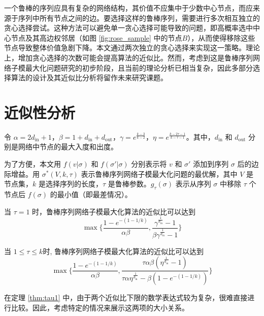 一个鲁棒的序列应具有复杂的网络结构，其价值不应集中于少数中心节点，而应来源于序列中所有节点之间的边。要选择这样的鲁棒序列，需要进行多次相互独立的贪心选择尝试。这种方法可以避免单一贪心选择可能导致的问题，即高概率选中中心节点及其高边权邻居（如图 \ref{fig:rose_sample} 中的节点$B$），从而使得移除这些节点导致整体价值急剧下降。本文通过两次独立的贪心选择来实现这一策略。理论上，增加贪心选择的次数可能会提高算法的近似比。然而，考虑到这是鲁棒序列网络子模最大化问题研究的初步阶段，且当前的理论分析已相当复杂，因此多部分选择算法的设计及其近似比分析将留作未来研究课题。

\section{近似性分析}
\label{sec:3_3}

令 $\alpha=2 d_{\text{in}}+1$，$\beta=1+d_{\text{in}}+d_{\text{out}}$，$\gamma=e^{\frac{k-3}{k-2}}$，$\eta=e^{\frac{k-2\tau-1}{k-\tau-1}}$。其中，$d_{\text{in}}$ 和 $d_{\text{out}}$ 分别是网络中节点的最大入度和出度。

为了方便，本文用 $f(v|\sigma)$ 和 $f(\sigma'|\sigma)$ 分别表示将 $v$ 和 $\sigma'$ 添加到序列 $\sigma$ 后的边际增益。用 $\sigma^*(V,k,\tau)$ 表示鲁棒序列网络子模最大化问题的最优解，其中 $V$ 是节点集，$k$ 是选择序列的长度，$\tau$ 是鲁棒参数。$g_\tau(\sigma)$ 表示从序列 $\sigma$ 中移除 $\tau$ 个节点后 $f(\sigma)$ 的最小值（即最差情况）。

\begin{theorem}
\label{thm:tau1}
当 $\tau=1$ 时，鲁棒序列网络子模最大化算法的近似比可以达到
\begin{equation}
\max\{\frac{1-e^{-(1-1/k)}}{\alpha\beta},\frac{\gamma^{\frac{1}{d_{\text{in}}}}-1}{\beta \gamma^{\frac{1}{d_{\text{in}}}}-1}\}\end{equation}
\end{theorem}

\begin{theorem}
\label{thm:tau2}
当 $1\le \tau \le k$时, 鲁棒序列网络子模最大化算法的近似比可以达到
\begin{equation}
 \max\{\frac{1-e^{-(1-1/k)}}{\alpha\beta},\frac{\tau\alpha\beta(\eta^{\frac{1}{d_{\text{in}}}}-1)}{\tau\alpha\eta^{\frac{1}{d_{\text{in}}}}- \beta (1-e^{-(1-1/k)}) }\}    
\end{equation}
\end{theorem}

在定理 \ref{thm:tau1} 中，由于两个近似比下限的数学表达式较为复杂，很难直接进行比较。因此，考虑特定的情况来展示这两项的大小关系。


